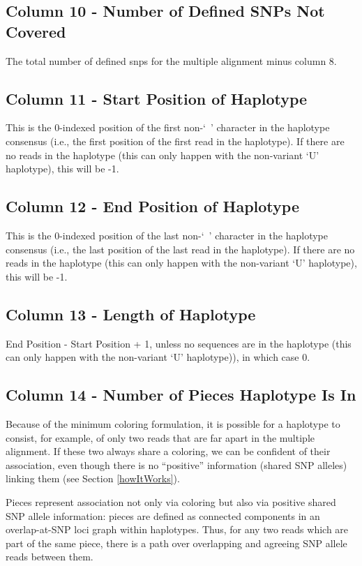 \documentclass[11pt]{llncs}
\begin{document}
\subsection{Column 10 - Number of Defined SNPs Not Covered}

The total number of defined snps for the multiple alignment minus column 8. 


\subsection{Column 11 - Start Position of Haplotype}

This is the 0-indexed position of the first non-`~' character in the haplotype consensus (i.e., the first position of the first read in the haplotype).
If there are no reads in the haplotype (this can only happen with the non-variant `U' haplotype), this will be -1.

\subsection{Column 12 - End Position of Haplotype}

This is the 0-indexed position of the last non-`~' character in the haplotype consensus (i.e., the last position of the last read in the haplotype).
If there are no reads in the haplotype (this can only happen with the non-variant `U' haplotype), this will be -1.

\subsection{Column 13 - Length of Haplotype}

End Position - Start Position + 1, unless no sequences are in the haplotype (this can only happen with the non-variant `U' haplotype)), in which case 0.

\subsection{Column 14 - Number of Pieces Haplotype Is In}

Because of the minimum coloring formulation, it is possible for a haplotype to consist, for example, of only two reads that are far apart in the multiple
alignment. If these two always share a coloring, we can be confident of their association, even though there is no ``positive'' information (shared SNP
alleles) linking them (see Section \ref{howItWorks}).

Pieces represent association not only via coloring but also via positive shared SNP allele information: pieces are defined as connected components in
an overlap-at-SNP loci graph within haplotypes. Thus, for any two reads which are part of the same piece, there is a path over overlapping and agreeing
SNP allele reads between them.
\end{document}
